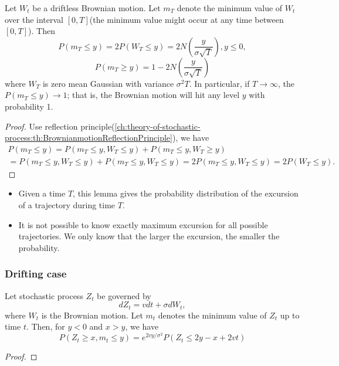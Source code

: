 \begin{refsection}
\begin{lemma}\label{ch:theory-of-stochastic-process:th:BrownianMotionPathexcursiondistribution}
	Let $W_t$ be a driftless Brownian motion. Let $m_T$ denote the minimum value of $W_t$ over the interval $[0,T]$(the minimum value might occur at any time between $[0,T]$). Then
	$$P(m_T \leq y) = 2P(W_T \leq y) = 2N(\frac{y}{\sigma \sqrt{T}}), y\leq 0,$$
	$$P(m_T \geq y) = 1 - 2N(\frac{y}{\sigma \sqrt{T}})$$
	where $W_T$ is zero mean Gaussian with variance $\sigma^2 T$.
	In particular, if $T\to \infty$, the $P(m_T \leq y) \to 1$; that is, the Brownian motion will hit any level $y$ with probability 1.
\end{lemma}
\begin{proof}
	Use reflection principle(\autoref{ch:theory-of-stochastic-process:th:BrownianmotionReflectionPrinciple}), we have
	\begin{align*}
	P(m_T\leq y) = P(m_T\leq y, W_T\leq y) + P(m_T\leq y, W_T\geq y) \\
	= P(m_T\leq y, W_T\leq y) + P(m_T\leq y, W_T\leq y) = 2P(m_T\leq y, W_T\leq y) = 2P(W_T\leq y).
	\end{align*}
\end{proof}

\begin{remark}
	\begin{itemize}
		\item Given a time $T$, this lemma gives the probability distribution of the excursion of a trajectory during time $T$.
		\item It is not possible to know exactly maximum excursion for all possible trajectories. We only know that the larger the excursion, the smaller the probability. 
	\end{itemize}
\end{remark}


\subsubsection{Drifting case}
\begin{lemma}\cite[213]{joshi2003concepts}
	Let stochastic process $Z_t$ be governed by 
	$$dZ_t = vdt + \sigma dW_t,$$
	where $W_t$ is the Brownian motion. Let $m_t$ denotes the minimum value of $Z_t$ up to time $t$. Then, for $y < 0$ and $x > y$, we have
	$$P(Z_t \geq x, m_t \leq y) = e^{2vy/\sigma^2}P(Z_t \leq 2y-x + 2vt)$$
\end{lemma}
\begin{proof}
	

\end{proof}
\end{refsection}
